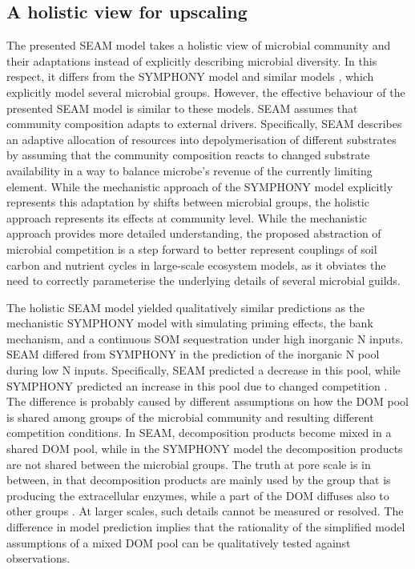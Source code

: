 \subsection{A holistic view for upscaling}
\label{sec:Holistic}

The presented SEAM model takes a holistic view \citep{Panikov10} of microbial
community and their adaptations instead of explicitly describing microbial
diversity.
In this respect, it differs from the SYMPHONY model \citep{Perveen14} and
similar models \citep{Fontaine03}, which explicitly model several microbial
groups.
However, the effective behaviour of the presented SEAM model is similar to these
models.
SEAM assumes that community composition adapts to external drivers.
Specifically, SEAM describes an adaptive allocation of resources into
depolymerisation of different substrates by assuming that the community
composition reacts to changed substrate availability in a way to balance
microbe's revenue of the currently limiting element.
While the mechanistic approach of the SYMPHONY model explicitly represents this
adaptation by shifts between microbial groups, the holistic approach represents
its effects at community level. While the mechanistic approach provides more
detailed understanding, the proposed abstraction of microbial competition is a
step forward to better represent couplings of soil carbon and nutrient cycles in
large-scale ecosystem models, as it obviates the need to correctly parameterise
the underlying details of several microbial guilds.

The holistic SEAM model yielded qualitatively similar predictions as the
mechanistic SYMPHONY model with simulating priming effects, the bank mechanism,
and a continuous SOM sequestration under high inorganic N inputs. SEAM differed
from SYMPHONY in the prediction of the inorganic N pool during low N inputs.
Specifically, SEAM predicted a decrease in this pool, while SYMPHONY predicted
an increase in this pool due to changed competition \citep{Perveen14}. The
difference is probably caused by different assumptions on how the DOM pool is
shared among groups of the microbial community and resulting different
competition conditions. In SEAM, decomposition products become mixed in a shared
DOM pool, while in the SYMPHONY model the decomposition products are not shared
between the microbial groups.
The truth at pore scale is in between, in that decomposition products are mainly
used by the group that is producing the extracellular enzymes, while a part of
the DOM diffuses also to other groups \citep{Kaiser14}. At larger scales, such
details cannot be measured or resolved. The difference in model prediction
implies that the rationality of the simplified model assumptions of a mixed DOM
pool can be qualitatively tested against observations.

